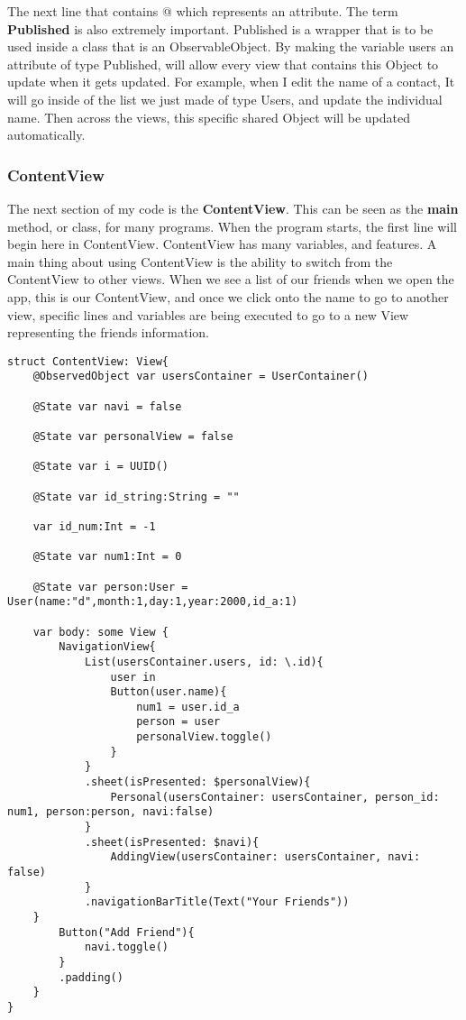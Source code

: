 \documentclass{article}
\theoremstyle{theorem}
\theoremstyle{definition}
\theoremstyle{remark}
\begin{document}
\noindent\newline The next line that contains @ which represents an attribute. The term \textbf{Published} is also extremely important. Published is a wrapper that is to be used inside a class that is an ObservableObject. By making the variable users an attribute of type Published, will allow every view that contains this Object to update when it gets updated. For example, when I edit the name of a contact, It will go inside of the list we just made of type Users, and update the individual name. Then across the views, this specific shared Object will be updated automatically. 

\subsubsection{ContentView}
The next section of my code is the \textbf{ContentView}. This can be seen as the \textbf{main} method, or class, for many programs. When the program starts, the first line will begin here in ContentView. ContentView has many variables, and features. A main thing about using ContentView is the ability to switch from the ContentView to other views. When we see a list of our friends when we open the app, this is our ContentView, and once we click onto the name to go to another view, specific lines and variables are being executed to go to a new View representing the friends information.

\begin{verbatim}
struct ContentView: View{
    @ObservedObject var usersContainer = UserContainer()
    
    @State var navi = false
    
    @State var personalView = false
    
    @State var i = UUID()
    
    @State var id_string:String = ""
    
    var id_num:Int = -1
    
    @State var num1:Int = 0
    
    @State var person:User = User(name:"d",month:1,day:1,year:2000,id_a:1) 
    
    var body: some View {
        NavigationView{
            List(usersContainer.users, id: \.id){
                user in
                Button(user.name){
                    num1 = user.id_a
                    person = user
                    personalView.toggle()
                }
            }
            .sheet(isPresented: $personalView){
                Personal(usersContainer: usersContainer, person_id: num1, person:person, navi:false)
            }
            .sheet(isPresented: $navi){
                AddingView(usersContainer: usersContainer, navi: false)
            }
            .navigationBarTitle(Text("Your Friends"))
    }
        Button("Add Friend"){
            navi.toggle()
        }
        .padding()
    }
}
\end{verbatim}
\end{document}
